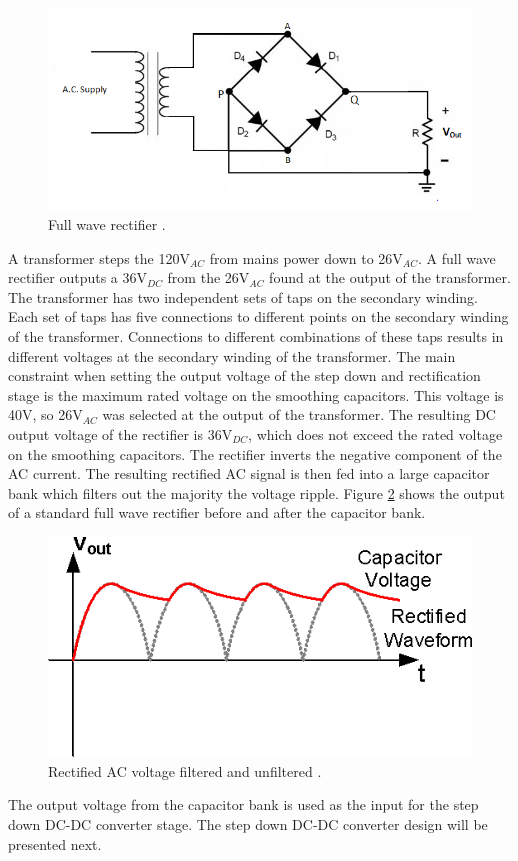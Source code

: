 \documentclass[11pt]{article}
\begin{document}
        \begin{figure}[H]
            \centering
            \includegraphics[width=0.5\linewidth]{fullwaverectifiercircuit.png}
            \caption{Full wave rectifier \cite{efy_group_half_207}.}
            \label{fig:Full Wave Rectifier}
            
        \end{figure}
         \noindent A transformer steps the 120V$_{AC}$ from mains power down to 26V$_{AC}$. A full wave rectifier outputs a 36V$_{DC}$ from the 26V$_{AC}$ found at the output of the transformer. The transformer has two independent sets of taps on the secondary winding. Each set of taps has five connections to different points on the secondary winding of the transformer. Connections to different combinations of these taps results in different voltages at the secondary winding of the transformer. The main constraint when setting the output voltage of the step down and rectification stage is the maximum rated voltage on the smoothing capacitors. This voltage is 40V, so 26V$_{AC}$ was selected at the output of the transformer. The resulting DC output voltage of the rectifier is 36V$_{DC}$, which does not exceed the rated voltage on the smoothing capacitors.
         \newline
         \newline
         \noindent The rectifier inverts the negative component of the AC current. The resulting rectified AC signal is then fed into a large capacitor bank which filters out the majority the voltage ripple. Figure \ref{cap} shows the output of a standard full wave rectifier before and after the capacitor bank. 
         \begin{figure}[H]
            \centering
            \includegraphics[width=0.6\linewidth]{2_16_0_12_eng.png}
            \caption{Rectified AC voltage filtered and unfiltered \cite{macao_communications_rectified_2012}.}
            \label{cap}
        \end{figure}
        \noindent The output voltage from the capacitor bank is used as the input for the step down DC-DC converter stage. The step down DC-DC converter design will be presented next.
        
\end{document}
